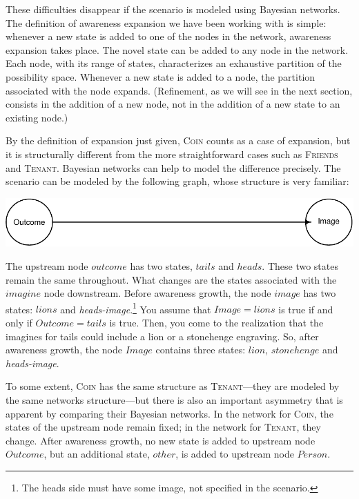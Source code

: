 \documentclass[
  11pt,
  dvipsnames,enabledeprecatedfontcommands]{scrartcl}
\begin{document}
These difficulties disappear if the scenario is modeled using Bayesian
networks. The definition of awareness expansion we have been working
with is simple: whenever a new state is added to one of the nodes in the
network, awareness expansion takes place. The novel state can be added
to any node in the network. Each node, with its range of states,
characterizes an exhaustive partition of the possibility space. Whenever
a new state is added to a node, the partition associated with the node
expands. (Refinement, as we will see in the next section, consists in
the addition of a new node, not in the addition of a new state to an
existing node.)

By the definition of expansion just given, \textsc{Coin} counts as a
case of expansion, but it is structurally different from the more
straightforward cases such as \textsc{Friends} and \textsc{Tenant}.
Bayesian networks can help to model the difference precisely. The
scenario can be modeled by the following graph, whose structure is very
familiar:

\begin{center}\includegraphics[width=0.5\linewidth,height=0.3\textheight]{ReplyToSteeleStefansson5_files/figure-latex/tailsDAG-1} \end{center}

\noindent The upstream node \(outcome\) has two states, \(tails\) and
\(heads\). These two states remain the same throughout. What changes are
the states associated with the \(imagine\) node downstream. Before
awareness growth, the node \(image\) has two states: \(lions\) and
\textit{heads-image}.\footnote{The heads side must have some image, not
  specified in the scenario.} You assume that \(Image=lions\) is true if
and only if \(Outcome=tails\) is true. Then, you come to the realization
that the imagines for tails could include a lion or a stonehenge
engraving. So, after awareness growth, the node \(Image\) contains three
states: \(lion\), \(stonehenge\) and \textit{heads-image}.

To some extent, \textsc{Coin} has the same structure as
\textsc{Tenant}---they are modeled by the same networks structure---but
there is also an important asymmetry that is apparent by comparing their
Bayesian networks. In the network for \textsc{Coin}, the states of the
upstream node remain fixed; in the network for \textsc{Tenant}, they
change. After awareness growth, no new state is added to upstream node
\(Outcome\), but an additional state, \(other\), is added to upstream
node \(Person\).
\end{document}
